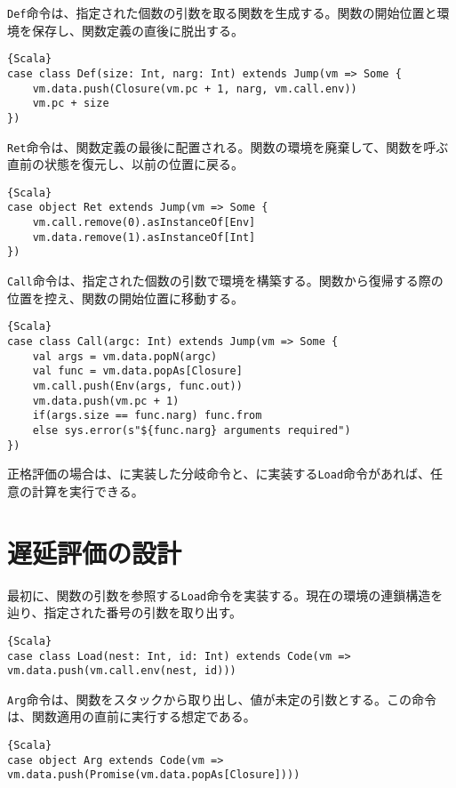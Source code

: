\documentclass[10pt,a4paper]{book}
\begin{document}
\texttt{Def}命令は、指定された個数の引数を取る関数を生成する。関数の開始位置と環境を保存し、関数定義の直後に脱出する。

\begin{Verbatim}{Scala}
case class Def(size: Int, narg: Int) extends Jump(vm => Some {
	vm.data.push(Closure(vm.pc + 1, narg, vm.call.env))
	vm.pc + size
})
\end{Verbatim}

\texttt{Ret}命令は、関数定義の最後に配置される。関数の環境を廃棄して、関数を呼ぶ直前の状態を復元し、以前の位置に戻る。

\begin{Verbatim}{Scala}
case object Ret extends Jump(vm => Some {
	vm.call.remove(0).asInstanceOf[Env]
	vm.data.remove(1).asInstanceOf[Int]
})
\end{Verbatim}

\texttt{Call}命令は、指定された個数の引数で環境を構築する。関数から復帰する際の位置を控え、関数の開始位置に移動する。

\begin{Verbatim}{Scala}
case class Call(argc: Int) extends Jump(vm => Some {
	val args = vm.data.popN(argc)
	val func = vm.data.popAs[Closure]
	vm.call.push(Env(args, func.out))
	vm.data.push(vm.pc + 1)
	if(args.size == func.narg) func.from
	else sys.error(s"${func.narg} arguments required")
})
\end{Verbatim}

正格評価の場合は、に実装した分岐命令と、に実装する\texttt{Load}命令があれば、任意の計算を実行できる。

\section{遅延評価の設計\label{sect:lazy}}

最初に、関数の引数を参照する\texttt{Load}命令を実装する。現在の環境の連鎖構造を辿り、指定された番号の引数を取り出す。

\begin{Verbatim}{Scala}
case class Load(nest: Int, id: Int) extends Code(vm => vm.data.push(vm.call.env(nest, id)))
\end{Verbatim}

\texttt{Arg}命令は、関数をスタックから取り出し、値が未定の引数とする。この命令は、関数適用の直前に実行する想定である。

\begin{Verbatim}{Scala}
case object Arg extends Code(vm => vm.data.push(Promise(vm.data.popAs[Closure])))
\end{Verbatim}
\end{document}
